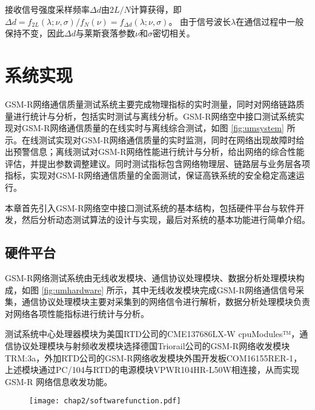 接收信号强度采样频率$\Delta d$由$2L/N$计算获得，即$\Delta d=f_{2L}(\lambda;\nu,\sigma)/f_{N}(\nu)=f_{\Delta d}(\lambda;\nu,\sigma)$。 由于信号波长$\lambda$在通信过程中一般保持不变，因此$\Delta d$与莱斯衰落参数$\nu$和$\sigma$密切相关。

\section{系统实现}
\label{sec:system_phy}

GSM-R网络通信质量测试系统主要完成物理指标的实时测量，同时对网络链路质量进行统计与分析，包括实时测试与离线分析。GSM-R网络空中接口测试系统实现对GSM-R网络通信质量的在线实时与离线综合测试，如图 \ref{fig:umsystem} 所示。在线测试实现对GSM-R网络通信质量的实时监测，同时在网络出现故障时给出预警信息；离线测试对GSM-R网络性能进行统计与分析，给出网络的综合性能评估，并提出参数调整建议。同时测试指标包含网络物理层、链路层与业务层各项指标，实现对GSM-R网络通信质量的全面测试，保证高铁系统的安全稳定高速运行。

本章首先引入GSM-R网络空中接口测试系统的基本结构，包括硬件平台与软件开发，然后分析动态测试算法的设计与实现，最后对系统的基本功能进行简单介绍。

\subsection{硬件平台}
\label{sec:um}

GSM-R网络测试系统由无线收发模块、通信协议处理模块、数据分析处理模块构成，如图 \ref{fig:umhardware} 所示，其中无线收发模块完成GSM-R网络通信信号采集，通信协议处理模块主要对采集到的网络信令进行解析，数据分析处理模块负责对网络各项性能指标进行统计与分析。

测试系统中心处理器模块为美国RTD公司的CME137686LX-W cpuModules™，通信协议处理模块与射频收发模块选择德国Triorail公司的GSM-R网络收发模块TRM:3a，外加RTD公司的GSM-R网络收发模块外围开发板COM16155RER-1，上述模块通过PC/104与RTD的电源模块VPWR104HR-L50W相连接，从而实现GSM-R 网络信息收发功能。

\begin{figure}[!htp]
\centering
    \texttt{[image: chap2/softwarefunction.pdf]}
\end{figure}

